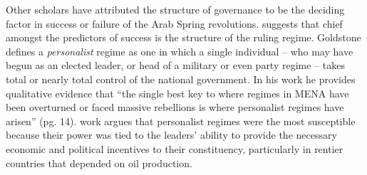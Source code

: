 
Other scholars have attributed the structure of governance to be the deciding factor in success or failure of the Arab Spring revolutions.  \citeauthor{goldstone_bringing_2013} \citeyearpar{goldstone_bringing_2013} suggests that chief amongst the predictors of success is the structure of the ruling regime.  Goldstone defines a \emph{personalist} regime as one in which a single individual – who may have begun as an elected leader, or head of a military or even party regime – takes total or nearly total control of the national government. In his work he provides qualitative evidence that ``the single best key to where regimes in MENA have been overturned or faced massive rebellions is where personalist regimes have arisen'' (pg. 14).  work argues that personalist regimes were the most susceptible because their power was tied to the leaders' ability to provide the necessary economic and political incentives to their constituency, particularly in rentier countries that depended on oil production. 

